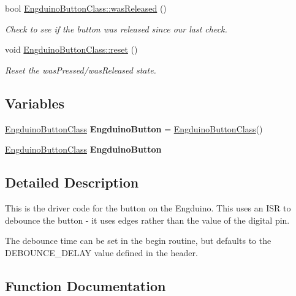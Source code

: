 \begin{DoxyCompactItemize}
bool \hyperlink{group___engduino_button_gad1df7a49cef083fb338415d172232f92}{Engduino\+Button\+Class\+::was\+Released} ()
\begin{DoxyCompactList}\small\item\em Check to see if the button was released since our last check. \end{DoxyCompactList}\item 
void \hyperlink{group___engduino_button_ga7725cc88999b6287c4b2e3ba0d2f4cac}{Engduino\+Button\+Class\+::reset} ()
\begin{DoxyCompactList}\small\item\em Reset the was\+Pressed/was\+Released state. \end{DoxyCompactList}\end{DoxyCompactItemize}
\subsection*{Variables}
\begin{DoxyCompactItemize}
\item 
\hypertarget{group___engduino_button_gafa9c41eb26e1fbf281f34e6c8870aedc}{}\hyperlink{class_engduino_button_class}{Engduino\+Button\+Class} {\bfseries Engduino\+Button} = \hyperlink{class_engduino_button_class}{Engduino\+Button\+Class}()\label{group___engduino_button_gafa9c41eb26e1fbf281f34e6c8870aedc}

\item 
\hypertarget{group___engduino_button_gafa9c41eb26e1fbf281f34e6c8870aedc}{}\hyperlink{class_engduino_button_class}{Engduino\+Button\+Class} {\bfseries Engduino\+Button}\label{group___engduino_button_gafa9c41eb26e1fbf281f34e6c8870aedc}

\end{DoxyCompactItemize}


\subsection{Detailed Description}
This is the driver code for the button on the Engduino. This uses an I\+S\+R to debounce the button -\/ it uses edges rather than the value of the digital pin.

The debounce time can be set in the begin routine, but defaults to the D\+E\+B\+O\+U\+N\+C\+E\+\_\+\+D\+E\+L\+A\+Y value defined in the header. 

\subsection{Function Documentation}
\hypertarget{group___engduino_button_ga22235e73e3a5e2e4b0a8c12709b53ea5}{}
